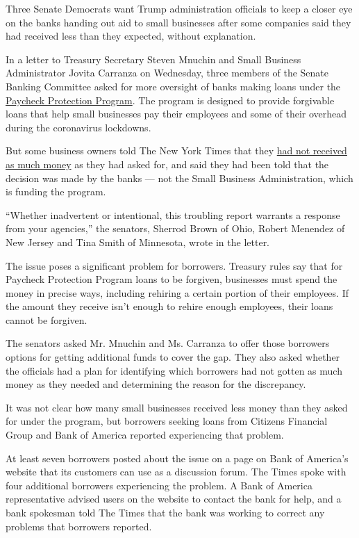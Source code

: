 Three Senate Democrats want Trump administration officials to keep a
closer eye on the banks handing out aid to small businesses after some
companies said they had received less than they expected, without
explanation.

In a letter to Treasury Secretary Steven Mnuchin and Small Business
Administrator Jovita Carranza on Wednesday, three members of the Senate
Banking Committee asked for more oversight of banks making loans under
the
\href{https://www.nytimes.com/2020/06/10/business/Small-business-loans-ppp.html}{Paycheck
Protection Program}. The program is designed to provide forgivable loans
that help small businesses pay their employees and some of their
overhead during the coronavirus lockdowns.

But some business owners told The New York Times that they
\href{https://www.nytimes.com/2020/05/11/business/coronavirus-aid-banks.html}{had
not received as much money} as they had asked for, and said they had
been told that the decision was made by the banks --- not the Small
Business Administration, which is funding the program.

``Whether inadvertent or intentional, this troubling report warrants a
response from your agencies,'' the senators, Sherrod Brown of Ohio,
Robert Menendez of New Jersey and Tina Smith of Minnesota, wrote in the
letter.

The issue poses a significant problem for borrowers. Treasury rules say
that for Paycheck Protection Program loans to be forgiven, businesses
must spend the money in precise ways, including rehiring a certain
portion of their employees. If the amount they receive isn't enough to
rehire enough employees, their loans cannot be forgiven.

The senators asked Mr. Mnuchin and Ms. Carranza to offer those borrowers
options for getting additional funds to cover the gap. They also asked
whether the officials had a plan for identifying which borrowers had not
gotten as much money as they needed and determining the reason for the
discrepancy.

It was not clear how many small businesses received less money than they
asked for under the program, but borrowers seeking loans from Citizens
Financial Group and Bank of America reported experiencing that problem.

At least seven borrowers posted about the issue on a page on Bank of
America's website that its customers can use as a discussion forum. The
Times spoke with four additional borrowers experiencing the problem. A
Bank of America representative advised users on the website to contact
the bank for help, and a bank spokesman told The Times that the bank was
working to correct any problems that borrowers reported.

